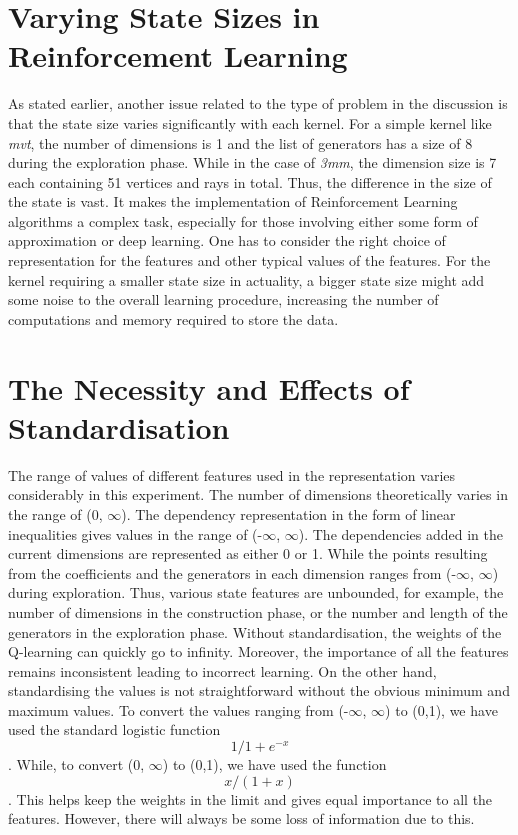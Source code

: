 \documentclass[logo,msc]{infthesis}           %
\begin{document}
\section{Varying State Sizes in Reinforcement Learning}
As stated earlier, another issue related to the type of problem in the discussion is that the state size varies significantly with each kernel. For a simple kernel like \textit{mvt}, the number of dimensions is 1 and the list of generators has a size of 8 during the exploration phase. While in the case of \textit{3mm}, the dimension size is 7 each containing 51 vertices and rays in total. Thus, the difference in the size of the state is vast. It makes the implementation of Reinforcement Learning algorithms a complex task, especially for those involving either some form of approximation or deep learning. One has to consider the right choice of representation for the features and other typical values of the features. For the kernel requiring a smaller state size in actuality, a bigger state size might add some noise to the overall learning procedure, increasing the number of computations and memory required to store the data.

\section{The Necessity and Effects of Standardisation}
The range of values of different features used in the representation varies considerably in this experiment. The number of dimensions theoretically varies in the range of (0, $\infty$). The dependency representation in the form of linear inequalities gives values in the range of (-$\infty$, $\infty$). The dependencies added in the current dimensions are represented as either 0 or 1. While the points resulting from the coefficients and the generators in each dimension ranges from (-$\infty$, $\infty$) during exploration. Thus, various state features are unbounded, for example, the number of dimensions in the construction phase, or the number and length of the generators in the exploration phase. Without standardisation, the weights of the Q-learning can quickly go to infinity. Moreover, the importance of all the features remains inconsistent leading to incorrect learning. On the other hand, standardising the values is not straightforward without the obvious minimum and maximum values. To convert the values ranging from (-$\infty$, $\infty$) to (0,1), we have used the standard logistic function \[{1/1+e^{-x}}\]. While, to convert (0, $\infty$) to (0,1), we have used the function \[{x / (1 + x)}\]. This helps keep the weights in the limit and gives equal importance to all the features. However, there will always be some loss of information due to this.
\end{document}
